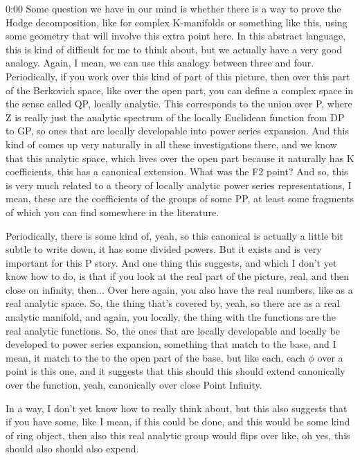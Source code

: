 \begin{unfinished}{0:00}
Some question we have in our mind is whether there is a way to prove the Hodge decomposition, like for complex K-manifolds or something like this, using some geometry that will involve this extra point here. In this abstract language, this is kind of difficult for me to think about, but we actually have a very good analogy. Again, I mean, we can use this analogy between three and four. Periodically, if you work over this kind of part of this picture, then over this part of the Berkovich space, like over the open part, you can define a complex space in the sense called QP, locally analytic. This corresponds to the union over P, where Z is really just the analytic spectrum of the locally Euclidean function from DP to GP, so ones that are locally developable into power series expansion. And this kind of comes up very naturally in all these investigations there, and we know that this analytic space, which lives over the open part because it naturally has K coefficients, this has a canonical extension. What was the F2 point? And so, this is very much related to a theory of locally analytic power series representations, I mean, these are the coefficients of the groups of some PP, at least some fragments of which you can find somewhere in the literature.

Periodically, there is some kind of, yeah, so this canonical is actually a little bit subtle to write down, it has some divided powers. But it exists and is very important for this P story. And one thing this suggests, and which I don't yet know how to do, is that if you look at the real part of the picture, real, and then close on infinity, then...
Over here again, you also have the real numbers, like as a real analytic space. So, the thing that's covered by, yeah, so there are as a real analytic manifold, and again, you locally, the thing with the functions are the real analytic functions. So, the ones that are locally developable and locally be developed to power series expansion, something that match to the base, and I mean, it match to the to the open part of the base, but like each, each $\phi$ over a point is this one, and it suggests that this should this should extend canonically over the function, yeah, canonically over close Point Infinity.

In a way, I don't yet know how to really think about, but this also suggests that if you have some, like I mean, if this could be done, and this would be some kind of ring object, then also this real analytic group would flips over like, oh yes, this should also should also expend.


\end{unfinished}
